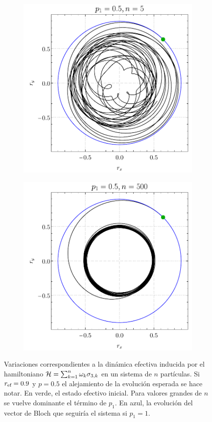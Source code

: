 \begin{figure}[ht!]
    \centering
    \begin{subfigure}{0.5\textwidth}
      \centering
      \includegraphics[width=0.9\linewidth]{chapter4/figures_separable/local_all_ran_p=0.5_r=0.9_n=5_a=-3_b=3.pdf}
    \end{subfigure}%
    \begin{subfigure}{0.5\textwidth}
      \centering
      \includegraphics[width=0.9\linewidth]{chapter4/figures_separable/local_all_ran_p=0.5_r=0.9_n=500_a=-3_b=3.pdf}
    \end{subfigure}
    \caption{Variaciones correspondientes a la dinámica efectiva inducida por el hamiltoniano $\mathcal{H}=\sum_{k=1}^{n}\omega_{k}\sigma_{3,k}$ en un sistema de $n$ partículas. Si $r_{\text{ef}}=0.9$ y $p=0.5$ el alejamiento de la evolución esperada se hace notar. En verde, el estado efectivo inicial. Para valores grandes de $n$ se vuelve dominante el término de $p_{1}$. En azul, la evolución del vector de Bloch que seguiría el sistema si $p_{1}=1$. \label{fig:Oscilations13}}
\end{figure}

\newpage

\pagebreak